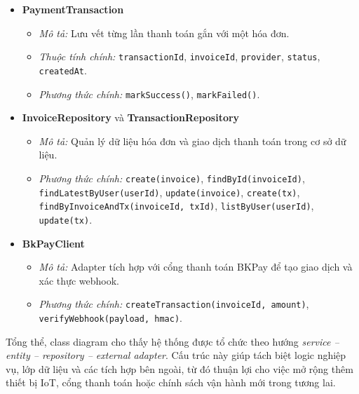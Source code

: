 \begin{itemize}[leftmargin=1.5cm]
    \item \textbf{PaymentTransaction}
    \begin{itemize}
        \item \textit{Mô tả:} Lưu vết từng lần thanh toán gắn với một hóa đơn.
        \item \textit{Thuộc tính chính:} \texttt{transactionId}, \texttt{invoiceId}, \texttt{provider}, \texttt{status}, \texttt{createdAt}.
        \item \textit{Phương thức chính:} \texttt{markSuccess()}, \texttt{markFailed()}.
    \end{itemize}

    \item \textbf{InvoiceRepository} và \textbf{TransactionRepository}
    \begin{itemize}
        \item \textit{Mô tả:} Quản lý dữ liệu hóa đơn và giao dịch thanh toán trong cơ sở dữ liệu.
        \item \textit{Phương thức chính:} \texttt{create(invoice)}, \texttt{findById(invoiceId)}, \texttt{findLatestByUser(userId)}, \texttt{update(invoice)}, \texttt{create(tx)}, \texttt{findByInvoiceAndTx(invoiceId, txId)}, \texttt{listByUser(userId)}, \texttt{update(tx)}.
    \end{itemize}

    \item \textbf{BkPayClient}
    \begin{itemize}
        \item \textit{Mô tả:} Adapter tích hợp với cổng thanh toán BKPay để tạo giao dịch và xác thực webhook.
        \item \textit{Phương thức chính:} \texttt{createTransaction(invoiceId, amount)}, \texttt{verifyWebhook(payload, hmac)}.
    \end{itemize}
\end{itemize}

\noindent Tổng thể, class diagram cho thấy hệ thống được tổ chức theo hướng \textit{service -- entity -- repository -- external adapter}. Cấu trúc này giúp tách biệt logic nghiệp vụ, lớp dữ liệu và các tích hợp bên ngoài, từ đó thuận lợi cho việc mở rộng thêm thiết bị IoT, cổng thanh toán hoặc chính sách vận hành mới trong tương lai.